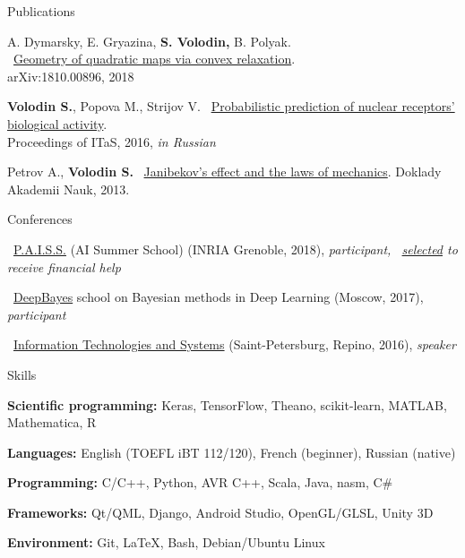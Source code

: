 \documentclass{resume} %
\begin{document}
\begin{rSection}{Publications}
\vspace{-1em}
\item A. Dymarsky, E. Gryazina, {\bf S. Volodin,} B. Polyak.\\ \faExternalLink~\href{https://arxiv.org/pdf/1810.00896.pdf}{Geometry of quadratic maps via convex relaxation}.\\ arXiv:1810.00896, 2018
\item {\bf Volodin S.}, Popova M., Strijov V. \faExternalLink~\href{http://itas2016.iitp.ru/pdf/1570303389.pdf}{Probabilistic prediction of nuclear receptors’ biological activity}.\\ Proceedings of ITaS, 2016, {\em in Russian}
\item Petrov A., {\bf Volodin S.} \faExternalLink~\href{https://link.springer.com/article/10.1134/S1028335813080041}{Janibekov's effect and the laws of mechanics}. Doklady Akademii Nauk, 2013.
\end{rSection}

\newpage

\begin{rSection}{Conferences}
\vspace{-1em}
\item \faExternalLink~\href{https://project.inria.fr/paiss/}{P.A.I.S.S.} (AI Summer School) (INRIA Grenoble, 2018){, \em participant, \faExternalLink~\href{http://www.europe.naverlabs.com/Blog/Students-at-PAISS}{selected} to receive financial help }
\item \faExternalLink~\href{http://deepbayes.ru}{DeepBayes} school on Bayesian methods in Deep Learning (Moscow, 2017){, \em participant}
\item \faExternalLink~\href{http://iitp.ru/en/conferences/itas}{Information Technologies and Systems} (Saint-Petersburg, Repino, 2016){, \em speaker}
\end{rSection}

\begin{rSection}{Skills}
	\vspace{-1em}
	\item {\bf Scientific programming:} Keras, TensorFlow, Theano, scikit-learn, MATLAB, Mathematica, R
	\item {\bf Languages:} English (TOEFL iBT 112/120), French (beginner), Russian (native)
	\item {\bf Programming:} C/C++, Python, AVR C++, Scala, Java, nasm, C\#
	\item {\bf Frameworks:} Qt/QML, Django, Android Studio, OpenGL/GLSL, Unity 3D
	\item {\bf Environment:} Git, \LaTeX, Bash, Debian/Ubuntu Linux
\end{rSection}
\end{document}
